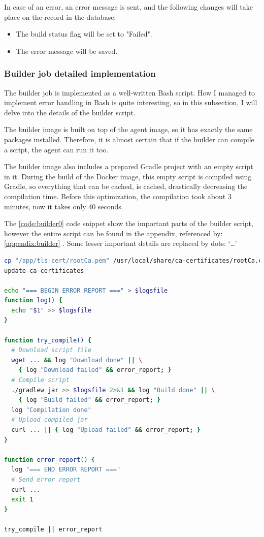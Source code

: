 In case of an error, an error message is sent, and the following changes will take place on the record in the database:

\begin{itemize}
    \item The build status flag will be set to "Failed".
    \item The error message will be saved.
\end{itemize}

\subsubsection{Builder job detailed implementation}

The builder job is implemented as a well-written Bash script. How I managed to implement error handling in Bash is quite interesting, so in this subsection, I will delve into the details of the builder script.

The builder image is built on top of the agent image, so it has exactly the same packages installed. Therefore, it is almost certain that if the builder can compile a script, the agent can run it too.

The builder image also includes a prepared Gradle project with an empty script in it. During the build of the Docker image, this empty script is compiled using Gradle, so everything that can be cached, is cached, drastically decreasing the compilation time. Before this optimization, the compilation took about 3 minutes, now it takes only 40 seconds.

The \ref{code:builder0} code snippet show the important parts of the builder script, however the entire script can be found in the appendix, referenced by: \ref{appendix:builder} . Some lesser important details are replaced by dots: `\dots'

\begin{lstlisting}[caption={Builder script},language=bash,label=code:builder0]
cp "/app/tls-cert/rootCa.pem" /usr/local/share/ca-certificates/rootCa.crt
update-ca-certificates

echo "=== BEGIN ERROR REPORT ===" > $logsfile
function log() {
  echo "$1" >> $logsfile
}
    
function try_compile() {
  # Download script file
  wget ... && log "Download done" || \
    { log "Download failed" && error_report; }
  # Compile script
  ./gradlew jar >> $logsfile 2>&1 && log "Build done" || \
    { log "Build failed" && error_report; }
  log "Compilation done"
  # Upload compiled jar
  curl ... || { log "Upload failed" && error_report; }
}

function error_report() {
  log "=== END ERROR REPORT ==="
  # Send error report
  curl ...
  exit 1
}

try_compile || error_report
\end{lstlisting}

